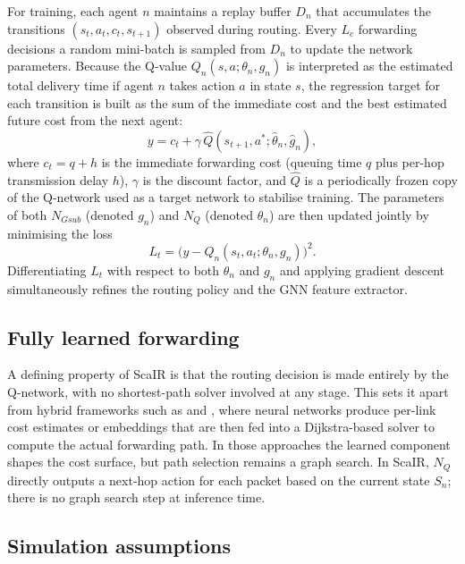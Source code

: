 \documentclass[10pt,twocolumn,letterpaper]{article}
\begin{document}
For training, each agent $n$ maintains a replay buffer $D_n$ that
accumulates the transitions $(s_t, a_t, c_t, s_{t+1})$ observed during
routing. Every $L_c$ forwarding decisions a random mini-batch is
sampled from $D_n$ to update the network parameters. Because the
Q-value $Q_n(s, a;\theta_n, g_n)$ is interpreted as the estimated total
delivery time if agent $n$ takes action $a$ in state $s$, the
regression target for each transition is built as the sum of the
immediate cost and the best estimated future cost from the next agent:
\begin{equation}
  y = c_t + \gamma\,\hat{Q}(s_{t+1}, a^*;\hat{\theta}_n, \hat{g}_n),
  \label{eq:target}
\end{equation}
where $c_t = q + h$ is the immediate forwarding cost (queuing time $q$
plus per-hop transmission delay $h$), $\gamma$ is the discount factor,
and $\hat{Q}$ is a periodically frozen copy of the Q-network used as
a target network to stabilise training. The parameters of both
$N_{Gsub}$ (denoted $g_n$) and $N_Q$ (denoted $\theta_n$) are then
updated jointly by minimising the loss
\begin{equation}
  L_t = \bigl(y - Q_n(s_t, a_t;\theta_n, g_n)\bigr)^2.
  \label{eq:loss}
\end{equation}
Differentiating $L_t$ with respect to both $\theta_n$ and $g_n$ and
applying gradient descent simultaneously refines the routing policy and
the GNN feature extractor.

\subsection{Fully learned forwarding}

A defining property of ScaIR is that the routing decision is made
entirely by the Q-network, with no shortest-path solver involved at any
stage. This sets it apart from hybrid frameworks such as
\cite{upc_routing} and \cite{autognn}, where neural networks produce
per-link cost estimates or embeddings that are then fed into a
Dijkstra-based solver to compute the actual forwarding path. In those
approaches the learned component shapes the cost surface, but path
selection remains a graph search. In ScaIR, $N_Q$ directly outputs a
next-hop action for each packet based on the current state $S_n$;
there is no graph search step at inference time.

\subsection{Simulation assumptions}
\end{document}
